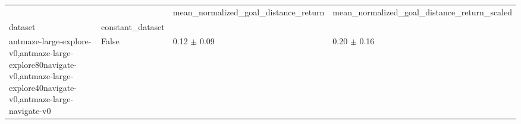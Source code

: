 \begin{tabular}{llll}
\toprule
 &  & mean_normalized_goal_distance_return & mean_normalized_goal_distance_return_scaled \\
dataset & constant_dataset &  &  \\
\midrule
antmaze-large-explore-v0,antmaze-large-explore80navigate-v0,antmaze-large-explore40navigate-v0,antmaze-large-navigate-v0 & False & 0.12 $\pm$ 0.09 & 0.20 $\pm$ 0.16 \\
\cline{1-4}
\bottomrule
\end{tabular}
